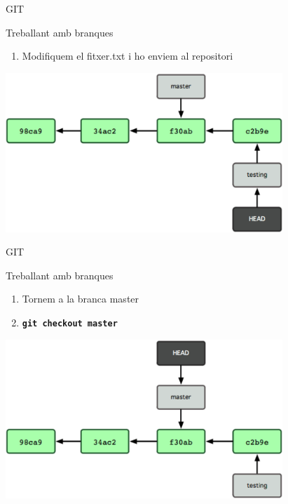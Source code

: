 \documentclass[10pt,xcolor={rgb}]{beamer}
\begin{document}
    \begin{frame}[fragile]{GIT}
      \begin{block}{Treballant amb branques}

        \begin{enumerate}
          \item Modifiquem el fitxer.txt i ho enviem al repositori
        \end{enumerate}

        \centering
        \includegraphics[height=6cm]{b3.png}

      \end{block}
    \end{frame}

    \begin{frame}[fragile]{GIT}
      \begin{block}{Treballant amb branques}

        \begin{enumerate}
          \item Tornem a la branca master
          \item \texttt{\textbf{git checkout master}}
        \end{enumerate}

        \centering
        \includegraphics[height=6cm]{b4.png}

      \end{block}
    \end{frame}
\end{document}
